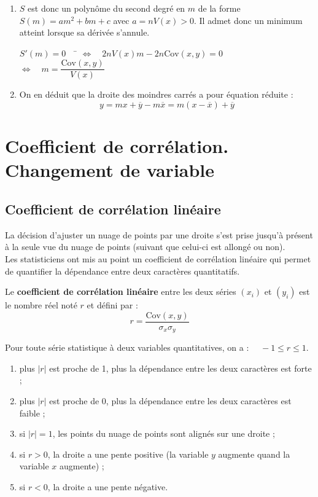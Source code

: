 \documentclass[a4paper,11pt,cours]{nsi} %
\begin{document}
\begin{demonstration}
\begin{enumerate}[label=\textbullet]
        \item $S$ est donc un polynôme du second degré en $m$ de la forme $S(m)=am^2+bm+c$ avec $a=nV(x)>0$. Il admet donc un minimum atteint lorsque sa dérivée s'annule.
        \begin{tabbing}
            $S'(m)=0\quad$ \= $\iff \quad \displaystyle 2nV(x)m-2n\mathrm{Cov}(x,y)=0$\\
            \> $\iff \quad \displaystyle m=\dfrac{\mathrm{Cov}(x,y)}{V(x)}$
        \end{tabbing}
        \item On en déduit que la droite des moindres carrés a pour équation réduite :
        $$y=mx+\overline{y}-m\overline{x}=m(x-\overline{x})+\overline{y}$$
    \end{enumerate}
\end{demonstration}



\section{Coefficient de corrélation. Changement de variable}

\subsection*{Coefficient de corrélation linéaire}

La décision d'ajuster un nuage de points par une droite s'est prise jusqu'à présent à la seule vue du nuage de points (suivant que celui-ci est allongé ou non).\\
Les statisticiens ont mis au point un coefficient de corrélation linéaire qui permet de quantifier la dépendance entre deux caractères quantitatifs.

\begin{definition}[]
    Le \textbf{coefficient de corrélation linéaire} entre les deux séries $(x_i)$ et $(y_i)$ est le nombre réel noté $r$ et défini par :
    $$r=\dfrac{\mathrm{Cov}(x,y)}{\sigma_x \sigma_y}$$
\end{definition}

\begin{propriete}[]
    Pour toute série statistique à deux variables quantitatives, on a : $\quad -1\leq r \leq 1$.
    \begin{enumerate}[label=\textbullet]
        \item plus $|r|$ est proche de 1, plus la dépendance entre les deux caractères est forte ;
        \item plus $|r|$ est proche de 0, plus la dépendance entre les deux caractères est faible ;
        \item si $|r|=1$, les points du nuage de points sont alignés sur une droite ;
        \item si $r>0$, la droite a une pente positive (la variable $y$ augmente quand la variable $x$ augmente) ;
        \item si $r<0$, la droite a une pente négative.
    \end{enumerate}
\end{propriete}
\end{document}
